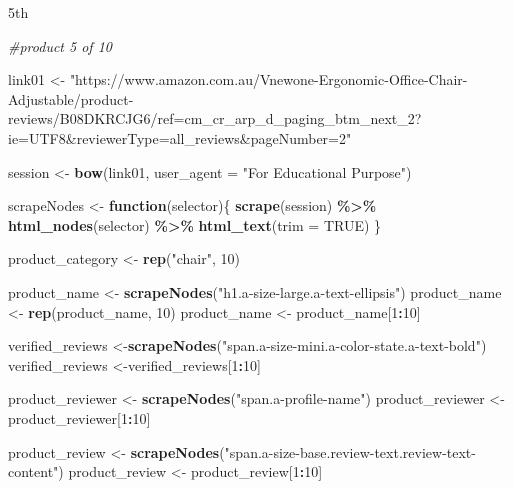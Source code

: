 \documentclass[
]{article}
\newenvironment{Shaded}{\begin{snugshade}}{\end{snugshade}}
\newcommand{\AttributeTok}[1]{\textcolor[rgb]{0.13,0.29,0.53}{#1}}
\newcommand{\CommentTok}[1]{\textcolor[rgb]{0.56,0.35,0.01}{\textit{#1}}}
\newcommand{\ConstantTok}[1]{\textcolor[rgb]{0.56,0.35,0.01}{#1}}
\newcommand{\ControlFlowTok}[1]{\textcolor[rgb]{0.13,0.29,0.53}{\textbf{#1}}}
\newcommand{\DecValTok}[1]{\textcolor[rgb]{0.00,0.00,0.81}{#1}}
\newcommand{\FunctionTok}[1]{\textcolor[rgb]{0.13,0.29,0.53}{\textbf{#1}}}
\newcommand{\NormalTok}[1]{#1}
\newcommand{\OtherTok}[1]{\textcolor[rgb]{0.56,0.35,0.01}{#1}}
\newcommand{\SpecialCharTok}[1]{\textcolor[rgb]{0.81,0.36,0.00}{\textbf{#1}}}
\newcommand{\StringTok}[1]{\textcolor[rgb]{0.31,0.60,0.02}{#1}}
\begin{document}
5th

\begin{Shaded}
\begin{Highlighting}[]
\CommentTok{\#product 5 of 10}
  
\NormalTok{link01 }\OtherTok{\textless{}{-}} \StringTok{"https://www.amazon.com.au/Vnewone{-}Ergonomic{-}Office{-}Chair{-}Adjustable/product{-}reviews/B08DKRCJG6/ref=cm\_cr\_arp\_d\_paging\_btm\_next\_2?ie=UTF8\&reviewerType=all\_reviews\&pageNumber=2"}


\NormalTok{  session }\OtherTok{\textless{}{-}} \FunctionTok{bow}\NormalTok{(link01,}
               \AttributeTok{user\_agent =} \StringTok{"For Educational Purpose"}\NormalTok{)}

\NormalTok{  scrapeNodes }\OtherTok{\textless{}{-}} \ControlFlowTok{function}\NormalTok{(selector)\{}
    \FunctionTok{scrape}\NormalTok{(session) }\SpecialCharTok{\%\textgreater{}\%}
      \FunctionTok{html\_nodes}\NormalTok{(selector) }\SpecialCharTok{\%\textgreater{}\%}
      \FunctionTok{html\_text}\NormalTok{(}\AttributeTok{trim =} \ConstantTok{TRUE}\NormalTok{)}
\NormalTok{  \}}

\NormalTok{  product\_category }\OtherTok{\textless{}{-}} \FunctionTok{rep}\NormalTok{(}\StringTok{"chair"}\NormalTok{, }\DecValTok{10}\NormalTok{)}

\NormalTok{  product\_name }\OtherTok{\textless{}{-}} \FunctionTok{scrapeNodes}\NormalTok{(}\StringTok{"h1.a{-}size{-}large.a{-}text{-}ellipsis"}\NormalTok{)}
\NormalTok{  product\_name }\OtherTok{\textless{}{-}} \FunctionTok{rep}\NormalTok{(product\_name, }\DecValTok{10}\NormalTok{)}
\NormalTok{  product\_name }\OtherTok{\textless{}{-}}\NormalTok{ product\_name[}\DecValTok{1}\SpecialCharTok{:}\DecValTok{10}\NormalTok{]}
  
\NormalTok{  verified\_reviews }\OtherTok{\textless{}{-}}\FunctionTok{scrapeNodes}\NormalTok{(}\StringTok{"span.a{-}size{-}mini.a{-}color{-}state.a{-}text{-}bold"}\NormalTok{)}
\NormalTok{  verified\_reviews }\OtherTok{\textless{}{-}}\NormalTok{verified\_reviews[}\DecValTok{1}\SpecialCharTok{:}\DecValTok{10}\NormalTok{]}
  
\NormalTok{  product\_reviewer }\OtherTok{\textless{}{-}} \FunctionTok{scrapeNodes}\NormalTok{(}\StringTok{"span.a{-}profile{-}name"}\NormalTok{)}
\NormalTok{  product\_reviewer }\OtherTok{\textless{}{-}}\NormalTok{ product\_reviewer[}\DecValTok{1}\SpecialCharTok{:}\DecValTok{10}\NormalTok{]}
  
\NormalTok{  product\_review }\OtherTok{\textless{}{-}} \FunctionTok{scrapeNodes}\NormalTok{(}\StringTok{"span.a{-}size{-}base.review{-}text.review{-}text{-}content"}\NormalTok{)}
\NormalTok{  product\_review }\OtherTok{\textless{}{-}}\NormalTok{ product\_review[}\DecValTok{1}\SpecialCharTok{:}\DecValTok{10}\NormalTok{]}
  

\end{Highlighting}
\end{Shaded}
\end{document}
